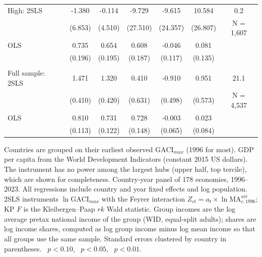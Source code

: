 \begin{table}[p]
\begin{minipage}{\linewidth}
{\begin{tabular}{lcccccc}
High: 2SLS & -1.380 & -0.114 & -9.729 & -9.615 & 10.584 & 0.2 \\
 & (6.853) & (4.510) & (27.510) & (24.357) & (26.807) & N = 1{,}607 \\
\quad OLS & 0.735\sym{***} & 0.654\sym{***} & 0.608\sym{***} & -0.046 & 0.081 \\
 & (0.196) & (0.195) & (0.187) & (0.117) & (0.135) \\
\addlinespace\multicolumn{7}{l}{\emph{Reference}}\\
Full sample: 2SLS & 1.471\sym{***} & 1.320\sym{***} & 0.410 & -0.910\sym{*} & 0.951\sym{*} & 21.1 \\
 & (0.410) & (0.420) & (0.631) & (0.498) & (0.573) & N = 4{,}537 \\
\quad OLS & 0.810\sym{***} & 0.731\sym{***} & 0.728\sym{***} & -0.003 & 0.023 \\
 & (0.113) & (0.122) & (0.148) & (0.065) & (0.084) \\
\bottomrule
\end{tabular}}
\par\vspace{3pt}\begin{flushleft}\footnotesize Countries are grouped on their earliest observed $\mathrm{GACI}_{max}$ (1996 for most). GDP per capita from the World Development Indicators (constant 2015 US dollars). The instrument has no power among the largest hubs (upper half, top tercile), which are shown for completeness. Country-year panel of 178 economies, 1996--2023. All regressions include country and year fixed effects and log population. 2SLS instruments $\ln\mathrm{GACI}_{max}$ with the Feyrer interaction $Z_{ct}=a_t\times\ln\mathrm{MA}^{air}_{c,1996}$; KP $F$ is the Kleibergen--Paap $rk$ Wald statistic. Group incomes are the log average pretax national income of the group (WID, equal-split adults); shares are log income shares, computed as log group income minus log mean income so that all groups use the same sample. Standard errors clustered by country in parentheses. \sym{*}~$p<0.10$, \sym{**}~$p<0.05$, \sym{***}~$p<0.01$.\end{flushleft}
\end{minipage}
\end{table}


